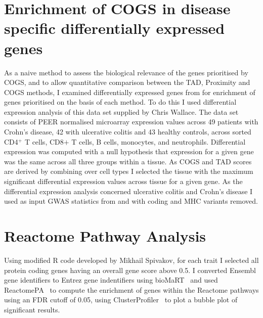 \documentclass[a4paper,11pt]{report}
\begin{document}
\section{Enrichment of COGS in disease specific differentially expressed genes}
As a naive method to assess the biological relevance of the genes prioritised by COGS, and to allow quantitative comparison between the TAD, Proximity and COGS methods, I examined  differentially expressed genes from \citet{PetersLyonsLeeEtAl2016} for enrichment of genes prioritised on the basis of each method. To do this I used differential expression analysis of this data set supplied by Chris Wallace. The data set consists of PEER normalised microarray expression values across 49 patients with Crohn's disease, 42 with ulcerative colitis and 43 healthy controls, across sorted  CD4$^+$ T cells, CD8$+$ T cells, B cells, monocytes, and neutrophils. Differential expression was computed with a null hypothesis that expression for a given gene was the same across all three groups within a tissue. As COGS and TAD scores are derived by combining over cell types I selected the tissue with the maximum significant differential expression values across tissue for a given gene. As the differential expression analysis concerned ulcerative colitis and Crohn's disease I used as input GWAS statistics from \citet{Anderson2011-ch} and \citet{Franke2010-mj} with coding and MHC variants removed.

\section{Reactome Pathway Analysis}
Using modified R code developed by Mikhail Spivakov, for each trait I selected all protein coding genes having an overall gene score above 0.5. I converted Ensembl gene identifiers to Entrez gene indentifiers using bioMaRT~\citep{DurinckSpellmanBirneyEtAl2009} and used ReactomePA~\citep{YuHe2016} to compute the enrichment of genes within the Reactome pathways using an FDR cutoff of 0.05, using ClusterProfiler~\citep{YuWangHanEtAl2012} to plot a bubble plot of significant results.  
\end{document}
